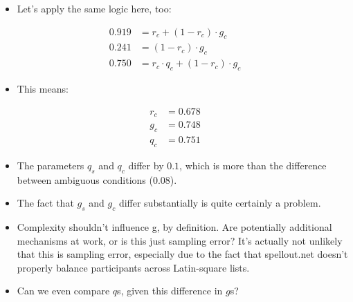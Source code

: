 \documentclass[
  english,
  doc]{apa6}
\providecommand{\tightlist}{%
  \setlength{\itemsep}{0pt}\setlength{\parskip}{0pt}}
\begin{document}
\begin{itemize}
\tightlist
\item
  Let's apply the same logic here, too:
\end{itemize}

\begin{align*}
  0.919 &= r_c + (1-r_c) \cdot g_c \\ 
  0.241 &= (1-r_c) \cdot g_c \\ 
  0.750 &= r_c \cdot q_c + (1-r_c) \cdot g_c
\end{align*}

\begin{itemize}
\tightlist
\item
  This means:
\end{itemize}

\begin{align*}
  r_c &= 0.678 \\ 
  g_c &= 0.748 \\
  q_c &= 0.751
\end{align*}

\begin{itemize}
\tightlist
\item
  The parameters \(q_s\) and \(q_c\) differ by \(0.1\), which is more than the difference between ambiguous conditions (\(0.08\)).
\item
  The fact that \(g_s\) and \(g_c\) differ substantially is quite certainly a problem.
\item
  Complexity shouldn't influence g, by definition. Are potentially additional mechanisms at work, or is this just sampling error? It's actually not unlikely that this is sampling error, especially due to the fact that spellout.net doesn't properly balance participants across Latin-square lists.\\
\item
  Can we even compare \(q\)s, given this difference in \(g\)s?
\end{itemize}
\end{document}

